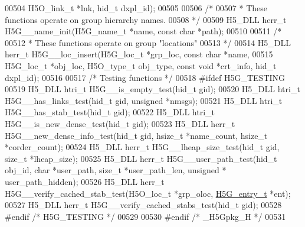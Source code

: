 \begin{DoxyCode}
00504     H5O\_link\_t *lnk, hid\_t dxpl\_id);
00505 
00506 \textcolor{comment}{/*}
00507 \textcolor{comment}{ * These functions operate on group hierarchy names.}
00508 \textcolor{comment}{ */}
00509 H5\_DLL herr\_t H5G\_\_name\_init(H5G\_name\_t *name, \textcolor{keyword}{const} \textcolor{keywordtype}{char} *path);
00510 
00511 \textcolor{comment}{/*}
00512 \textcolor{comment}{ * These functions operate on group "locations"}
00513 \textcolor{comment}{ */}
00514 H5\_DLL herr\_t H5G\_\_loc\_insert(H5G\_loc\_t *grp\_loc, \textcolor{keyword}{const} \textcolor{keywordtype}{char} *name,
00515     H5G\_loc\_t *obj\_loc, H5O\_type\_t obj\_type, \textcolor{keyword}{const} \textcolor{keywordtype}{void} *crt\_info, hid\_t dxpl\_id);
00516 
00517 \textcolor{comment}{/* Testing functions */}
00518 \textcolor{preprocessor}{#ifdef H5G\_TESTING}
00519 H5\_DLL htri\_t H5G\_\_is\_empty\_test(hid\_t gid);
00520 H5\_DLL htri\_t H5G\_\_has\_links\_test(hid\_t gid, \textcolor{keywordtype}{unsigned} *nmsgs);
00521 H5\_DLL htri\_t H5G\_\_has\_stab\_test(hid\_t gid);
00522 H5\_DLL htri\_t H5G\_\_is\_new\_dense\_test(hid\_t gid);
00523 H5\_DLL herr\_t H5G\_\_new\_dense\_info\_test(hid\_t gid, hsize\_t *name\_count, hsize\_t *corder\_count);
00524 H5\_DLL herr\_t H5G\_\_lheap\_size\_test(hid\_t gid, \textcolor{keywordtype}{size\_t} *lheap\_size);
00525 H5\_DLL herr\_t H5G\_\_user\_path\_test(hid\_t obj\_id, \textcolor{keywordtype}{char} *user\_path, \textcolor{keywordtype}{size\_t} *user\_path\_len, \textcolor{keywordtype}{unsigned} *
      user\_path\_hidden);
00526 H5\_DLL herr\_t H5G\_\_verify\_cached\_stab\_test(H5O\_loc\_t *grp\_oloc, \hyperlink{struct_h5_g__entry__t}{H5G\_entry\_t} *ent);
00527 H5\_DLL herr\_t H5G\_\_verify\_cached\_stabs\_test(hid\_t gid);
00528 \textcolor{preprocessor}{#endif }\textcolor{comment}{/* H5G\_TESTING */}\textcolor{preprocessor}{}
00529 
00530 \textcolor{preprocessor}{#endif }\textcolor{comment}{/* \_H5Gpkg\_H */}\textcolor{preprocessor}{}
00531 
\end{DoxyCode}
